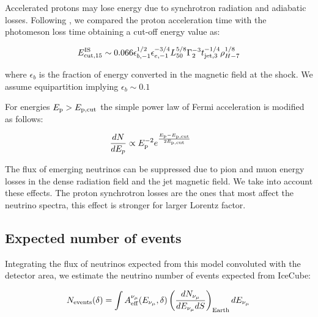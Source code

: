 \documentclass[twocolumn]{aastex631}
\begin{document}
Accelerated protons may lose energy due to synchrotron radiation and adiabatic losses. Following \cite{Fasano2021}, we compared the proton acceleration time with the photomeson loss time obtaining a cut-off energy value as:

\begin{equation}
    E_{\rm cut,15}^{\rm IS} \sim 0.066 \epsilon_{b,-1}^{1/2} \epsilon_{e,-1}^{-3/4} L_{50}^{5/8} \Gamma_2^{-3} t_{\rm jet,3}^{-1/4} \rho_{H-7}^{1/8}
\end{equation}

where $\epsilon_{b}$ is the fraction of energy converted in the magnetic field at the shock.  We assume equipartition implying  $\epsilon_{b}\sim 0.1$ 


For energies $E_{\rm p}>E_{\rm p,\rm cut}$ the simple power law of Fermi acceleration is modified as follows:

\begin{equation}
    \frac{dN}{dE_p} \propto E_{\rm p}^{-2} e^{\frac{E_{\rm p}-E_{\rm p,cut}}{2E_{\rm p, cut}}} \qquad
    \end{equation}

The flux of emerging neutrinos can be suppressed due to pion and muon energy losses in the dense radiation field and the jet magnetic field. We take into account these effects. The proton synchrotron losses are the ones that most affect the neutrino spectra, this effect is stronger for larger Lorentz factor.


\subsection{Expected number of events}

Integrating the flux of neutrinos expected from this model convoluted with the detector area, we estimate the neutrino number of events expected from IceCube:


\begin{equation}
\label{Eq:Nevents}
    N_{\rm events}(\delta)= \int A_{\rm eff}^{\nu_\mu} (E_{\nu_{\mu}},\delta) \left( \frac{dN_{\nu_\mu}}{dE_{\nu_\mu}dS} \right)_{\rm Earth} dE_{\nu_\mu} \, 
\end{equation}
\end{document}
